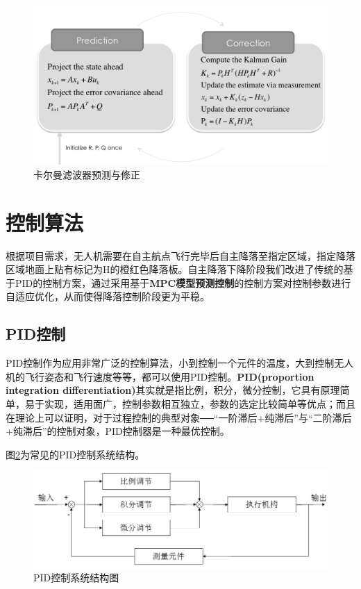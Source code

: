 \begin{figure}[ht]
  \centering
  \includegraphics[width=0.8\linewidth]{./Figure/Kalman_Prediction_and_Correction.png}
  \caption{卡尔曼滤波器预测与修正}\label{Fig:img3}
\end{figure}

\section{控制算法}

根据项目需求，无人机需要在自主航点飞行完毕后自主降落至指定区域，指定降落区域地面上贴有标记为H的橙红色降落板。自主降落下降阶段我们改进了传统的基于PID的控制方案，通过采用基于\textbf{MPC模型预测控制}的控制方案对控制参数进行自适应优化，从而使得降落控制阶段更为平稳。

\subsection{PID控制}

PID控制作为应用非常广泛的控制算法，小到控制一个元件的温度，大到控制无人机的飞行姿态和飞行速度等等，都可以使用PID控制。\textbf{PID(proportion integration differentiation)}其实就是指比例，积分，微分控制，它具有原理简单，易于实现，适用面广，控制参数相互独立，参数的选定比较简单等优点；而且在理论上可以证明，对于过程控制的典型对象──“一阶滞后+纯滞后”与“二阶滞后+纯滞后”的控制对象，PID控制器是一种最优控制\cite{ArtE2}。

图\ref{Fig:img4}为常见的PID控制系统结构。

\begin{figure}[ht]
  \centering
  \includegraphics[width=0.8\linewidth]{./Figure/PID_Graph.png}
  \caption{PID控制系统结构图}\label{Fig:img4}
\end{figure}

